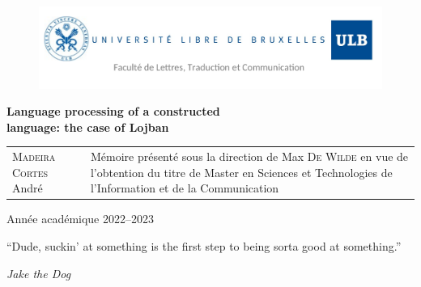 

\usepackage[
    backend=bibtex, style=authortitle, defernumbers=true, backref=true, block=none, hyperref=true
]{biblatex}



\setlength{}



\begin{titlingpage}

\begin{figure}[H]
\vspace{-2cm}
\hspace{-2.5cm}
\includegraphics[scale=0.30]{images/header.png}
\end{figure}

\vfill

\begin{center}
\hspace{-0.5cm}
\Huge{\textbf{Language processing of a constructed \\language: the case of Lojban}}\\
\end{center}

\vfill

\begin{tabular}{b{6.5cm}b{7.5cm}}
\textsc{Madeira Cortes} André & Mémoire présenté sous la direction de Max \textsc{De Wilde}
en vue de l'obtention du titre de Master en Sciences et Technologies de l'Information et de la Communication\\
\end{tabular}

\vfill

\begin{center}
\Large Année académique 2022--2023
\end{center}

\end{titlingpage}

\pagestyle{empty}

\renewcommand{\epigraphsize}{\large}
\renewcommand{\epigraphwidth}{7cm}
\epigraph{“Dude, suckin’ at something is the first step to being sorta good at something.”}{\textit{Jake the Dog}}

